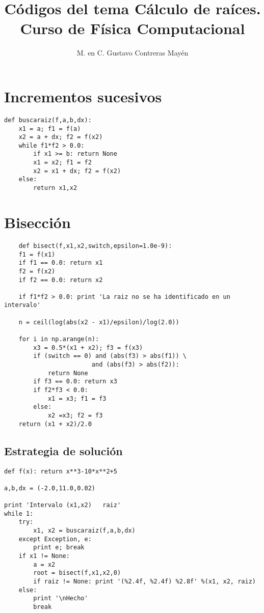 \documentclass[11pt]{article}
\title{C\'{o}digos del tema C\'{a}lculo de ra\'{i}ces. \\ Curso de F\'{i}sica Computacional}
\author{M. en C. Gustavo Contreras May\'{e}n}
\date{ }
\begin{document}
\maketitle
\fontsize{14}{14}\selectfont
\section{Incrementos sucesivos}
\begin{lstlisting}
def buscaraiz(f,a,b,dx):
    x1 = a; f1 = f(a)
    x2 = a + dx; f2 = f(x2)
    while f1*f2 > 0.0:
        if x1 >= b: return None
        x1 = x2; f1 = f2
        x2 = x1 + dx; f2 = f(x2)
    else:
        return x1,x2
\end{lstlisting}
\section{Bisecci\'{o}n}
\begin{lstlisting}
	def bisect(f,x1,x2,switch,epsilon=1.0e-9):
    f1 = f(x1)
    if f1 == 0.0: return x1
    f2 = f(x2)
    if f2 == 0.0: return x2
    
    if f1*f2 > 0.0: print 'La raiz no se ha identificado en un intervalo'

    n = ceil(log(abs(x2 - x1)/epsilon)/log(2.0))
	
	for i in np.arange(n):
        x3 = 0.5*(x1 + x2); f3 = f(x3)
        if (switch == 0) and (abs(f3) > abs(f1)) \
                        and (abs(f3) > abs(f2)):
            return None
        if f3 == 0.0: return x3
        if f2*f3 < 0.0:
            x1 = x3; f1 = f3
        else:
            x2 =x3; f2 = f3
    return (x1 + x2)/2.0
\end{lstlisting}
\subsection{Estrategia de soluci\'{o}n}
\begin{lstlisting}
def f(x): return x**3-10*x**2+5

a,b,dx = (-2.0,11.0,0.02)
	
print 'Intervalo (x1,x2)   raiz'
while 1:
    try:
        x1, x2 = buscaraiz(f,a,b,dx)
    except Exception, e:
        print e; break
    if x1 != None:
        a = x2
        root = bisect(f,x1,x2,0)
        if raiz != None: print '(%2.4f, %2.4f) %2.8f' %(x1, x2, raiz)
    else:
        print '\nHecho'
        break
\end{lstlisting}
\end{document}
